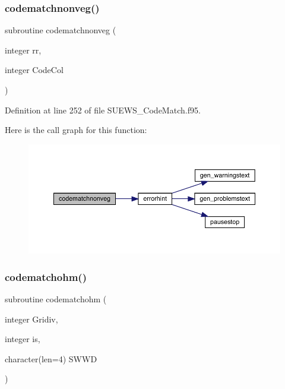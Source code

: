 \subsubsection{\texorpdfstring{codematchnonveg()}{codematchnonveg()}}
{\footnotesize\ttfamily subroutine codematchnonveg (\begin{DoxyParamCaption}\item[{integer}]{rr,  }\item[{integer}]{Code\+Col }\end{DoxyParamCaption})}



Definition at line 252 of file S\+U\+E\+W\+S\+\_\+\+Code\+Match.\+f95.

Here is the call graph for this function\+:\nopagebreak
\begin{figure}[H]
\begin{center}
\leavevmode
\includegraphics[width=350pt]{_s_u_e_w_s___code_match_8f95_a368250cd24c62a2bf3f524dbca0b1da4_cgraph}
\end{center}
\end{figure}
\mbox{\label{_s_u_e_w_s___code_match_8f95_a18fb6403f079ac99af5a646b8f01e05e}} 
\subsubsection{\texorpdfstring{codematchohm()}{codematchohm()}}
{\footnotesize\ttfamily subroutine codematchohm (\begin{DoxyParamCaption}\item[{integer}]{Gridiv,  }\item[{integer}]{is,  }\item[{character(len=4)}]{S\+W\+WD }\end{DoxyParamCaption})}



